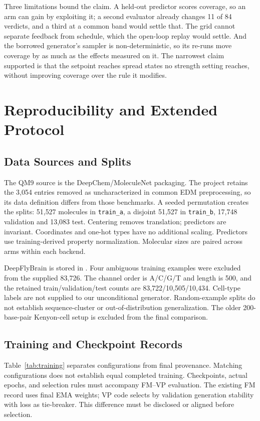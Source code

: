 \documentclass{article}
\begin{document}
Three limitations bound the claim. A held-out predictor scores coverage, so an arm can gain by exploiting it; a second evaluator already changes 11 of 84 verdicts, and a third at a common band would settle that. The grid cannot separate feedback from schedule, which the open-loop replay would settle. And the borrowed generator's sampler is non-deterministic, so its re-runs move coverage by as much as the effects measured on it. The narrowest claim supported is that the setpoint reaches spread states no strength setting reaches, without improving coverage over the rule it modifies.
\clearpage


\clearpage
\appendix
\renewcommand{\thetable}{S\arabic{table}}
\setcounter{table}{0}
\renewcommand{\thefigure}{S\arabic{figure}}
\setcounter{figure}{0}
\section{Reproducibility and Extended Protocol}
\subsection{Data Sources and Splits}\label{app:data}
The QM9 source is the DeepChem/MoleculeNet packaging. The project retains the 3{,}054 entries removed as uncharacterized in common EDM preprocessing, so its data definition differs from those benchmarks. A seeded permutation creates the splits: 51{,}527 molecules in \texttt{train\_a}, a disjoint 51{,}527 in \texttt{train\_b}, 17{,}748 validation and 13{,}083 test. Centering removes translation; predictors are invariant. Coordinates and one-hot types have no additional scaling. Predictors use training-derived property normalization. Molecular sizes are paired across arms within each backend.

DeepFlyBrain is stored in . Four ambiguous training examples were excluded from the supplied 83{,}726. The channel order is A/C/G/T and length is 500, and the retained train/validation/test counts are 83{,}722/10{,}505/10{,}434. Cell-type labels are not supplied to our unconditional generator. Random-example splits do not establish sequence-cluster or out-of-distribution generalization. The older 200-base-pair Kenyon-cell setup is excluded from the final comparison.

\subsection{Training and Checkpoint Records}\label{app:training}
Table~\ref{tab:training} separates configurations from final provenance. Matching configurations does not establish equal completed training. Checkpoints, actual epochs, and selection rules must accompany FM--VP evaluation. The existing FM record uses final EMA weights; VP code selects by validation generation stability with loss as tie-breaker. This difference must be disclosed or aligned before selection.
\end{document}
